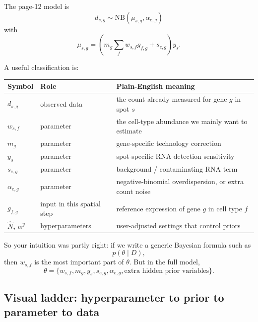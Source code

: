 \documentclass[11pt]{article}
\newcommand{\NB}{\mathrm{NB}}
\begin{document}
The page-12 model is
\[
d_{s,g}\sim \NB(\mu_{s,g},\alpha_{e,g})
\]
with
\[
\mu_{s,g}=\left(m_g\sum_f w_{s,f}g_{f,g}+s_{e,g}\right)y_s.
\]

A useful classification is:

\begin{center}
\begin{tabularx}{0.96\textwidth}{>{\bfseries}p{}p{}X}
\toprule
Symbol & Role & Plain-English meaning \\
\midrule
$d_{s,g}$ & observed data & the count already measured for gene $g$ in spot $s$ \\
$w_{s,f}$ & parameter & the cell-type abundance we mainly want to estimate \\
$m_g$ & parameter & gene-specific technology correction \\
$y_s$ & parameter & spot-specific RNA detection sensitivity \\
$s_{e,g}$ & parameter & background / contaminating RNA term \\
$\alpha_{e,g}$ & parameter & negative-binomial overdispersion, or extra count noise \\
$g_{f,g}$ & input in this spatial step & reference expression of gene $g$ in cell type $f$ \\
$\hat N$, $\alpha^y$ & hyperparameters & user-adjusted settings that control priors \\
\bottomrule
\end{tabularx}
\end{center}

So your intuition was partly right: if we write a generic Bayesian formula such as
\[
p(\theta\mid D),
\]
then $w_{s,f}$ is the most important part of $\theta$. But in the full model,
\[
\theta=\{w_{s,f},m_g,y_s,s_{e,g},\alpha_{e,g},\text{extra hidden prior variables}\}.
\]

\subsection{Visual ladder: hyperparameter to prior to parameter to data}
\end{document}
